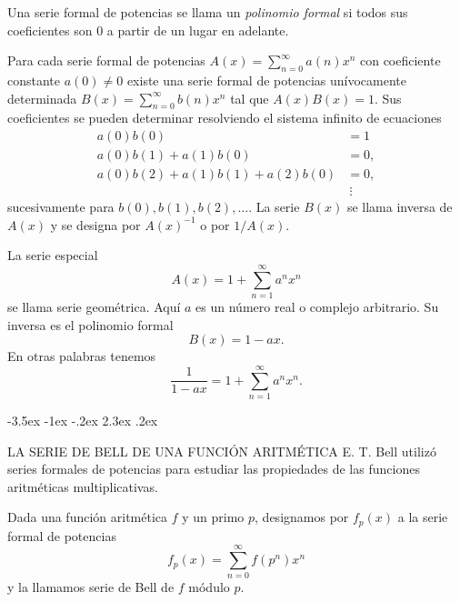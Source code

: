 \documentclass[12pt,a4paper]{book}
\makeatletter
\renewcommand\section{\@startsection{section}{1}{\z@}%
  {-3.5ex \@plus -1ex \@minus -.2ex}%
  {2.3ex \@plus .2ex}%
  {\normalfont\Large\bfseries\raggedright}}
\makeatother
\begin{document}
    Una serie formal de potencias se llama un \textit{polinomio formal} si todos sus
    coeficientes son 0 a partir de un lugar en adelante.

    Para cada serie formal de potencias $A(x)=\sum_{n=0}^{\infty}a(n)x^{n}$ con coeficiente
    constante $a(0)\neq0$ existe una serie formal de potencias unívocamente determinada
    $B(x)=\sum_{n=0}^{\infty}b(n)x^{n}$ tal que $A(x)B(x)=1$. Sus coeficientes se pueden
    determinar resolviendo el sistema infinito de ecuaciones
    \begin{align*}
        a(0)b(0)&=1\\
        a(0)b(1)+a(1)b(0)&=0,\\
        a(0)b(2)+a(1)b(1)+a(2)b(0)&=0,\\
        &\ \vdots
    \end{align*}
    sucesivamente para $b(0),b(1),b(2),\dots$. La serie $B(x)$ se llama inversa de $A(x)$
    y se designa por $A(x)^{-1}$ o por $1/A(x)$.

    La serie especial
    \begin{equation*}
        A(x)=1+\sum_{n=1}^{\infty}a^{n}x^{n}
    \end{equation*}
    se llama serie geométrica. Aquí $a$ es un número real o complejo arbitrario. Su inversa
    es el polinomio formal
    \begin{equation*}
        B(x)=1-ax.
    \end{equation*}
    En otras palabras tenemos
    \begin{equation*}
        \frac{1}{1-ax}=1+\sum_{n=1}^{\infty}a^{n}x^{n}.
    \end{equation*}

    \section{LA SERIE DE BELL DE UNA FUNCIÓN ARITMÉTICA}\label{sim:bell}
    E. T. Bell \cite{bell1915} utilizó series formales de potencias para estudiar las propiedades de las
    funciones aritméticas multiplicativas.

    \begin{definicion}
        Dada una función aritmética $f$ y un primo $p$, designamos por $f_{p}(x)$ a la serie
        formal de potencias
        \begin{equation*}
            f_{p}(x)=\sum_{n=0}^{\infty}f(p^{n})x^{n}
        \end{equation*}
        y la llamamos serie de Bell de $f$ módulo $p$.
    \end{definicion}
\end{document}

